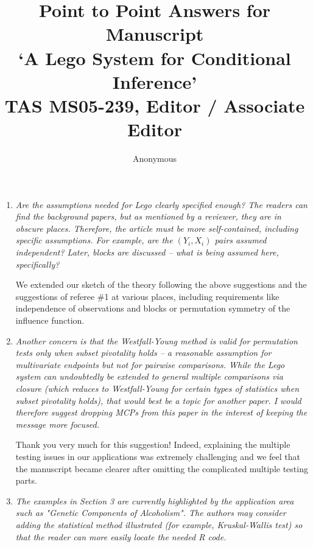 \documentclass[11pt]{article}
\begin{document}
\title{Point to Point Answers for Manuscript \\
`A Lego System for Conditional Inference' \\
TAS MS05-239, Editor / Associate Editor}
\author{Anonymous}
\maketitle

\begin{enumerate}

\item \textsl{Are the assumptions needed for Lego clearly specified enough? 
              The readers can find the background papers, but as mentioned by a reviewer, 
              they are in obscure places.  Therefore, the article must be more self-contained, 
              including specific assumptions.  For example, are the $(Y_i, X_i)$ pairs assumed independent?  
              Later, blocks are discussed -- what is being assumed here, specifically?}

We extended our sketch of the theory following the above suggestions and the
suggestions of referee \#1 at various places, including requirements like
independence of observations and blocks or permutation symmetry of the
influence function. 

\item \textsl{Another concern is that the Westfall-Young method is valid for permutation tests 
              only when subset pivotality holds -- a reasonable assumption for multivariate 
              endpoints but not for pairwise comparisons.  While the Lego system can undoubtedly be 
              extended to general multiple comparisons via closure (which reduces to Westfall-Young 
              for certain types of statistics when subset pivotality holds), that would best be a 
              topic for another paper.  I would therefore suggest dropping MCPs from this paper 
              in the interest of keeping the message more focused.}

Thank you very much for this suggestion! Indeed, explaining the multiple
testing issues in our applications was extremely challenging and we feel
that the manuscript became clearer after omitting the complicated multiple
testing parts. 

\item \textsl{The examples in Section 3 are currently highlighted by the application area 
              such as "Genetic Components of Alcoholism". The authors may consider adding the 
              statistical method illustrated (for example, Kruskal-Wallis test) so that the 
              reader can more easily locate the needed R code.}


\end{enumerate}
\end{document}
